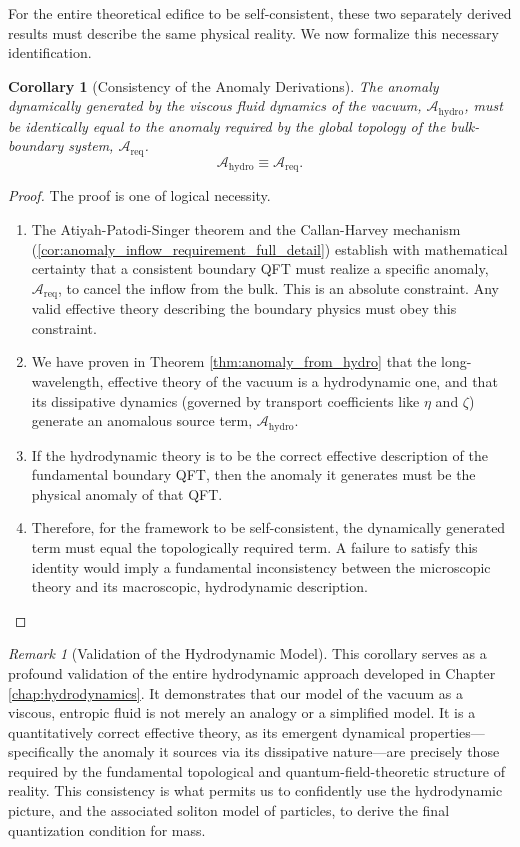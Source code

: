 \documentclass[11pt, letterpaper]{report}
\theoremstyle{plain} %
\newtheorem{corollary}[theorem]{Corollary}
\theoremstyle{definition} %
\theoremstyle{remark} %
\newtheorem{remark}{Remark}[chapter]
\begin{document}
For the entire theoretical edifice to be self-consistent, these two separately derived results must describe the same physical reality. We now formalize this necessary identification.

\begin{corollary}[Consistency of the Anomaly Derivations]
\label{cor:consistency_anomaly_pictures}
The anomaly dynamically generated by the viscous fluid dynamics of the vacuum, $\mathcal{A}_{\text{hydro}}$, must be identically equal to the anomaly required by the global topology of the bulk-boundary system, $\mathcal{A}_{\text{req}}$.
\begin{equation}
    \mathcal{A}_{\text{hydro}} \equiv \mathcal{A}_{\text{req}}.
\end{equation}
\end{corollary}
\begin{proof}
The proof is one of logical necessity.
\begin{enumerate}
    \item The Atiyah-Patodi-Singer theorem and the Callan-Harvey mechanism (\cref{cor:anomaly_inflow_requirement_full_detail}) establish with mathematical certainty that a consistent boundary QFT must realize a specific anomaly, $\mathcal{A}_{\text{req}}$, to cancel the inflow from the bulk. This is an absolute constraint. Any valid effective theory describing the boundary physics must obey this constraint.
    \item We have proven in Theorem \ref{thm:anomaly_from_hydro} that the long-wavelength, effective theory of the vacuum is a hydrodynamic one, and that its dissipative dynamics (governed by transport coefficients like $\eta$ and $\zeta$) generate an anomalous source term, $\mathcal{A}_{\text{hydro}}$.
    \item If the hydrodynamic theory is to be the correct effective description of the fundamental boundary QFT, then the anomaly it generates must be the physical anomaly of that QFT.
    \item Therefore, for the framework to be self-consistent, the dynamically generated term must equal the topologically required term. A failure to satisfy this identity would imply a fundamental inconsistency between the microscopic theory and its macroscopic, hydrodynamic description.
\end{enumerate}
\end{proof}

\begin{remark}[Validation of the Hydrodynamic Model]
This corollary serves as a profound validation of the entire hydrodynamic approach developed in Chapter \ref{chap:hydrodynamics}. It demonstrates that our model of the vacuum as a viscous, entropic fluid is not merely an analogy or a simplified model. It is a quantitatively correct effective theory, as its emergent dynamical properties—specifically the anomaly it sources via its dissipative nature—are precisely those required by the fundamental topological and quantum-field-theoretic structure of reality. This consistency is what permits us to confidently use the hydrodynamic picture, and the associated soliton model of particles, to derive the final quantization condition for mass.
\end{remark}
\end{document}
